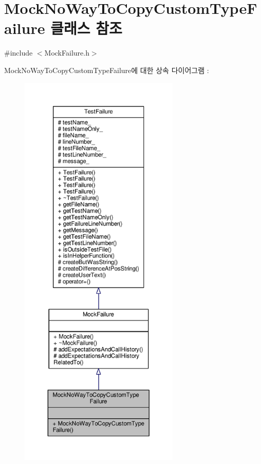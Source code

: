 \hypertarget{class_mock_no_way_to_copy_custom_type_failure}{}\section{Mock\+No\+Way\+To\+Copy\+Custom\+Type\+Failure 클래스 참조}
\label{class_mock_no_way_to_copy_custom_type_failure}


{\ttfamily \#include $<$Mock\+Failure.\+h$>$}



Mock\+No\+Way\+To\+Copy\+Custom\+Type\+Failure에 대한 상속 다이어그램 \+: 
\nopagebreak
\begin{figure}[H]
\begin{center}
\leavevmode
\includegraphics[height=550pt]{class_mock_no_way_to_copy_custom_type_failure__inherit__graph}
\end{center}
\end{figure}


